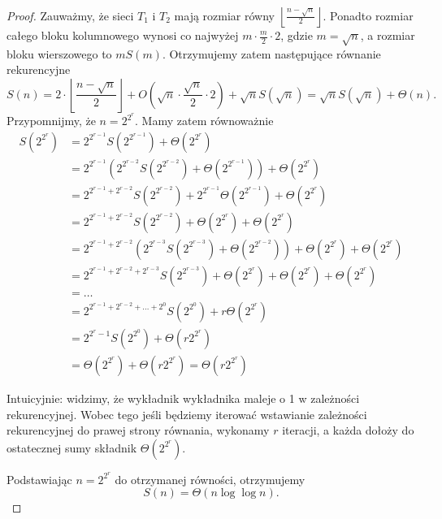 \documentclass[a4paper]{article}
\newcommand{\td}{\text{.}}
\newcommand{\floor}[1]{\left\lfloor #1 \right\rfloor}
\newcommand{\lt}{\left}
\newcommand{\rt}{\right}
\theoremstyle{definition}
\begin{document}
\begin{proof}
    Zauważmy, że sieci \(T_1\) i \(T_2\) mają rozmiar równy \( \floor{\frac{n - \sqrt{n}}{2}} \). Ponadto rozmiar całego bloku kolumnowego wynosi co najwyżej \(m \cdot \frac{m}{2} \cdot 2\), gdzie \(m = \sqrt{n}\), a rozmiar bloku wierszowego to \(mS(m)\).  Otrzymujemy zatem następujące równanie rekurencyjne
    \[
    S(n) = 2 \cdot \floor{\frac{n - \sqrt{n}}{2}} + O\left(\sqrt{n} \cdot \frac{\sqrt{n}}{2} \cdot 2\right) + \sqrt{n}S(\sqrt{n})
    = \sqrt{n}S(\sqrt{n}) + \Theta(n) \td
    \]
    Przypomnijmy, że \(n = 2^{2^r}\).  Mamy zatem równoważnie
    \begin{align*}
         S \lt( 2^{2^r} \rt) 
         &= 2^{2^{r-1}} S \lt( 2^{2^{r-1}} \rt) + \Theta \lt( 2^{2^r} \rt) \\
         &= 2^{2^{r-1}} \lt( 2^{2^{r-2}} S \lt( 2^{2^{r-2}} \rt) + \Theta \lt( 2^{2^{r-1}} \rt) \rt) + \Theta \lt( 2^{2^r} \rt) \\
         &= 2^{2^{r-1} + 2^{r-2}} S \lt( 2^{2^{r-2}} \rt)
         + 2^{2^{r-1}} \Theta \lt( 2^{2^{r-1}} \rt) + \Theta \lt( 2^{2^{r}} \rt) \\
         &= 2^{2^{r-1} + 2^{r-2}} S \lt( 2^{2^{r-2}} \rt)
         + \Theta \lt( 2^{2^{r}} \rt) + \Theta \lt( 2^{2^{r}} \rt) \\
         &= 2^{2^{r-1} + 2^{r-2}}  \lt( 2^{2^{r-3}} S \lt( 2^{2^{r-3}} \rt) + \Theta \lt( 2^{2^{r-2}} \rt)  \rt)
         + \Theta \lt( 2^{2^{r}} \rt) + \Theta \lt( 2^{2^{r}} \rt) \\
         &=  2^{2^{r-1} + 2^{r-2} + 2^{r-3}} S \lt( 2^{2^{r-3}} \rt)  + \Theta \lt( 2^{2^{r}} \rt) + \Theta \lt( 2^{2^{r}} \rt) + \Theta \lt( 2^{2^{r}} \rt) \\
         &= \ldots \\
         &=  2^{2^{r-1} + 2^{r-2} + \ldots + 2^{0}} S \lt( 2^{2^{0}} \rt) + r \Theta \lt( 2^{2^{r}} \rt) \\
         &= 2^{2^{r}-1} S \lt( 2^{2^{0}} \rt) + \Theta \lt( r2^{2^{r}} \rt) \\
         &= \Theta \lt( 2^{2^{r}} \rt) + \Theta \lt( r 2^{2^{r}} \rt) = \Theta \lt( r2^{2^{r}} \rt)
    \end{align*}
   
    Intuicyjnie: widzimy, że wykładnik wykładnika maleje o 1 w zależności rekurencyjnej. Wobec tego jeśli będziemy iterować wstawianie zależności rekurencyjnej do prawej strony równania, wykonamy \(r\) iteracji, a każda dołoży do ostatecznej sumy składnik \( \Theta \lt( 2^{2^{r}} \rt) \).

    \vspace{1em}

    Podstawiając \(n = 2^{2^r}\) do otrzymanej równości, otrzymujemy
    \[
    S(n) = \Theta(n \log \log n) \td
    \]
    
\end{proof}
\end{document}
